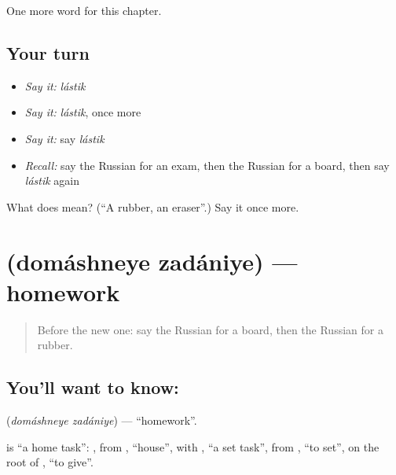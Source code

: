 \begin{grammarlens}[title={What you've built}]
One more word for this chapter.
\end{grammarlens}

\subsection*{Your turn}
\begin{itemize}
\raggedright
  \item \emph{Say it:} \emph{lástik}
  \item \emph{Say it:} \emph{lástik}, once more
  \item \emph{Say it:} say \emph{lástik}
  \item \emph{Recall:} say the Russian for an exam, then the Russian for a board, then say \emph{lástik} again
\end{itemize}

\begin{tcolorbox}[breakable,colback=teal!4,colframe=teal!35!black,title={Before you move on}]
What does  mean? (\textquotedblleft{}A rubber, an eraser\textquotedblright{}.) Say it once more.
\end{tcolorbox}
\section[\texorpdfstring{\ru{домашнее} \ru{задание} (domáshneye zadániye)}{домашнее задание (domáshneye zadániye)}]{  (domáshneye zadániye) — homework}

\label{lesson:RU-C111-homework}



\begin{quote}
Before the new one: say the Russian for a board, then the Russian for a rubber.
\end{quote}

\subsection*{You'll want to know:  }
\textbf{ } (\emph{domáshneye zadániye}) — \textquotedblleft{}homework\textquotedblright{}.

\begin{cousinweb}
\textbf{ } is \textquotedblleft{}a home task\textquotedblright{}: \emph{}, from \emph{}, \textquotedblleft{}house\textquotedblright{}, with \emph{}, \textquotedblleft{}a set task\textquotedblright{}, from \emph{}, \textquotedblleft{}to set\textquotedblright{}, on the root of \emph{}, \textquotedblleft{}to give\textquotedblright{}.
\end{cousinweb}

